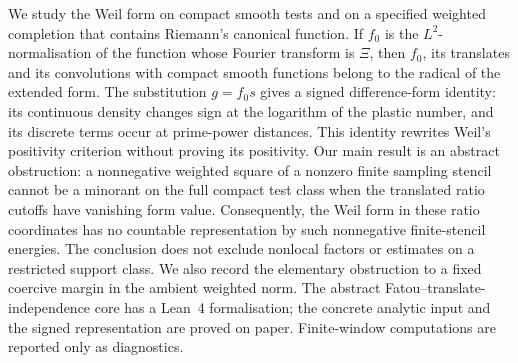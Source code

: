 We study the Weil form on compact smooth tests and on a specified weighted
completion that contains Riemann's canonical function. If $f_0$ is the
$L^2$-normalisation of the function whose Fourier transform is $\Xi$, then
$f_0$, its translates and its convolutions with compact smooth functions
belong to the radical of the extended form. The substitution $g=f_0s$
gives a signed difference-form identity: its continuous density changes
sign at the logarithm of the plastic number, and its discrete terms occur
at prime-power distances. This identity rewrites Weil's positivity
criterion without proving its positivity. Our main result is an abstract
obstruction: a nonnegative weighted square of a nonzero finite sampling
stencil cannot be a minorant on the full compact test class when the
translated ratio cutoffs have vanishing form value. Consequently, the
Weil form in these ratio coordinates has no countable representation by
such nonnegative finite-stencil energies. The conclusion does not exclude
nonlocal factors or estimates on a restricted support class. We also
record the elementary obstruction to a fixed coercive margin in the
ambient weighted norm. The abstract Fatou--translate-independence core
has a Lean~4 formalisation; the concrete analytic input and the signed
representation are proved on paper. Finite-window computations are
reported only as diagnostics.
